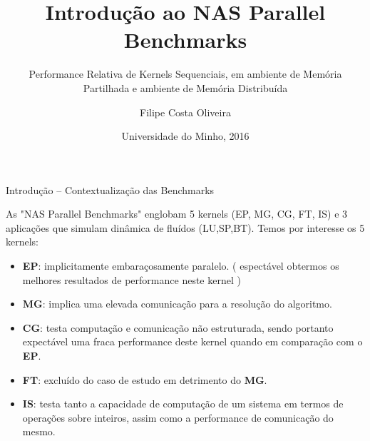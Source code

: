 \documentclass{beamer}
\title{Introdução ao NAS Parallel Benchmarks}
\subtitle{Performance Relativa de Kernels Sequenciais, em ambiente de Memória Partilhada e ambiente de Memória Distribuída}
\author{ Filipe Costa Oliveira}
\institute[Universidade of Minho] %
{
  UCE: Engenharia de Sistemas de Computação \\ 
  Mestrado Integrado em Engenharia Informática\\
  Departamento de Informática
 }
\date{Universidade do Minho, 2016}
\begin{document}
\begin{frame}
  \titlepage
\end{frame}


\begin{frame}{Introdução -- Contextualização das Benchmarks}

As "NAS Parallel Benchmarks" englobam 5 kernels (EP, MG, CG, FT, IS) e 3 aplicações  que simulam dinâmica de fluídos (LU,SP,BT). Temos por interesse os 5 kernels:

\begin{itemize}

\item \textbf{EP}: implicitamente embaraçosamente paralelo. ( espectável obtermos os melhores resultados de performance neste kernel )

\item \textbf{MG}: implica uma elevada comunicação para a resolução do algoritmo. 

\item \textbf{CG}:  testa computação e comunicação não estruturada, sendo portanto expectável uma fraca performance deste kernel quando em comparação com o \textbf{EP}. 

\item \textbf{FT}: excluído do caso de estudo em detrimento do \textbf{MG}.


\item \textbf{IS}: testa tanto a capacidade de computação de um sistema em termos de operações sobre inteiros, assim como a performance de comunicação do mesmo.

 \end{itemize}


  \end{frame}
  
\end{document}

